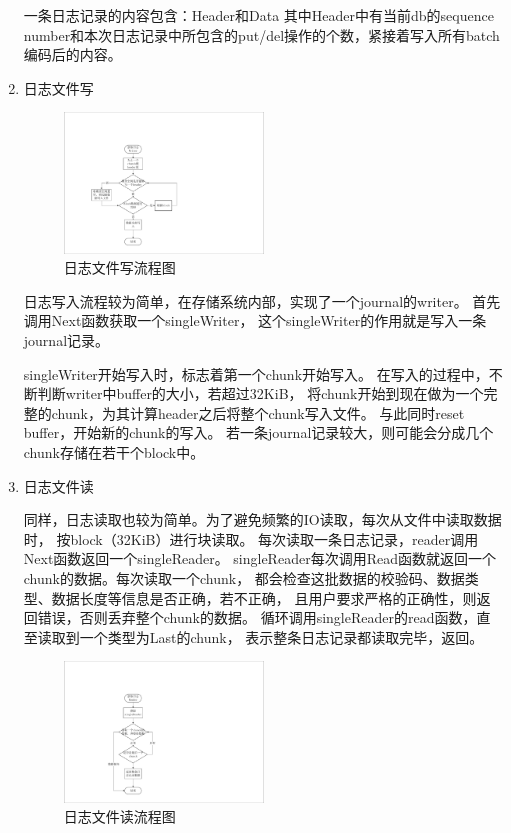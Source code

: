 \begin{enumerate}
   一条日志记录的内容包含：Header和Data
   其中Header中有当前db的sequence number和本次日志记录中所包含的put/del操作的个数，紧接着写入所有batch编码后的内容。
   \item 日志文件写 
   
   \begin{figure}[h]
   	\centering
   	\includegraphics[width=0.50\textwidth]{pdf/journal_write.pdf}
   	\caption{日志文件写流程图}
   	\label{journal_write}
   \end{figure}

   日志写入流程较为简单，在存储系统内部，实现了一个journal的writer。
   首先调用Next函数获取一个singleWriter，
   这个singleWriter的作用就是写入一条journal记录。

   singleWriter开始写入时，标志着第一个chunk开始写入。
   在写入的过程中，不断判断writer中buffer的大小，若超过32KiB，
   将chunk开始到现在做为一个完整的chunk，为其计算header之后将整个chunk写入文件。
   与此同时reset buffer，开始新的chunk的写入。
   若一条journal记录较大，则可能会分成几个chunk存储在若干个block中。

   \item 日志文件读 
   
   同样，日志读取也较为简单。为了避免频繁的IO读取，每次从文件中读取数据时，
   按block（32KiB）进行块读取。
   每次读取一条日志记录，reader调用Next函数返回一个singleReader。
   singleReader每次调用Read函数就返回一个chunk的数据。每次读取一个chunk，
   都会检查这批数据的校验码、数据类型、数据长度等信息是否正确，若不正确，
   且用户要求严格的正确性，则返回错误，否则丢弃整个chunk的数据。
	循环调用singleReader的read函数，直至读取到一个类型为Last的chunk，
   表示整条日志记录都读取完毕，返回。

   \begin{figure}[H]
	   \centering
	   \includegraphics[width=0.50\textwidth]{pdf/journal_read.pdf}
	   \caption{日志文件读流程图}
	   \label{journal_read}
   \end{figure}
   
   

   \end{enumerate}

